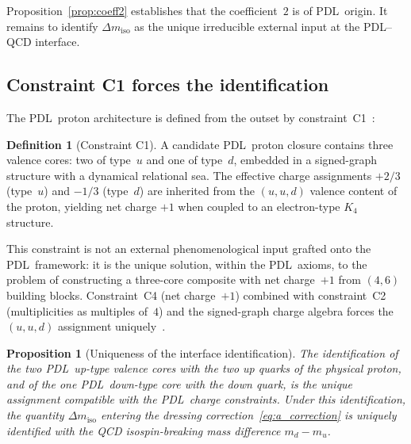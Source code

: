 \documentclass[11pt,a4paper]{article}
\newtheorem{proposition}[theorem]{Proposition}
\theoremstyle{definition}
\newtheorem{definition}[theorem]{Definition}
\newcommand{\PDL}{\textnormal{PDL}}
\newcommand{\Kfour}{K_4}
\newcommand{\dmiso}{\Delta m_{\mathrm{iso}}}
\begin{document}
Proposition~\ref{prop:coeff2} establishes that the coefficient~$2$ is of \PDL\ origin. It remains to identify $\dmiso$ as the unique irreducible external input at the \PDL--QCD interface.

\subsection{Constraint C1 forces the identification}
\label{subsec:C1}

The \PDL\ proton architecture is defined from the outset by constraint~C1~\cite{Combinatorial_Proton_v2_2026}:

\begin{definition}[Constraint C1]
\label{def:C1}
A candidate \PDL\ proton closure contains three valence cores: two of type~$u$ and one of type~$d$, embedded in a signed-graph structure with a dynamical relational sea. The effective charge assignments $+2/3$ (type~$u$) and $-1/3$ (type~$d$) are inherited from the $(u,u,d)$ valence content of the proton, yielding net charge $+1$ when coupled to an electron-type $\Kfour$ structure.
\end{definition}

This constraint is not an external phenomenological input grafted onto the \PDL\ framework: it is the unique solution, within the \PDL\ axioms, to the problem of constructing a three-core composite with net charge~$+1$ from $(4,6)$ building blocks. Constraint~C4 (net charge~$+1$) combined with constraint~C2 (multiplicities as multiples of~$4$) and the signed-graph charge algebra forces the $(u,u,d)$ assignment uniquely~\cite{Combinatorial_Proton_v2_2026}.

\begin{proposition}[Uniqueness of the interface identification]
\label{prop:interface}
The identification of the two \PDL\ up-type valence cores with the two up quarks of the physical proton, and of the one \PDL\ down-type core with the down quark, is the unique assignment compatible with the \PDL\ charge constraints. Under this identification, the quantity $\dmiso$ entering the dressing correction~\eqref{eq:a_correction} is uniquely identified with the QCD isospin-breaking mass difference $m_d - m_u$.
\end{proposition}
\end{document}

